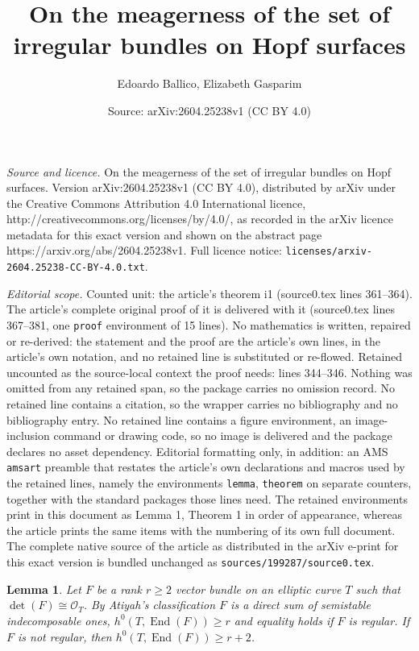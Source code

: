 \documentclass[10pt,a4paper]{amsart}
\title{On the meagerness of the set of irregular bundles on Hopf surfaces}
\author{Edoardo Ballico, Elizabeth Gasparim}
\date{Source: arXiv:2604.25238v1 (CC BY 4.0)}
\newtheorem{lemma}{Lemma}
\newcommand{\End}{\op{End}}
\newcommand{\Oo}{\enm{\cal{O}}}
\newcommand{\cal}[1]{\mathcal{#1}}
\newcommand{\enm}[1]{\ensuremath{#1}}          %
\newcommand{\op}[1]{\operatorname{#1}}
\begin{document}
\maketitle

\noindent\emph{Source and licence.} On the meagerness of the set of irregular bundles on Hopf surfaces. Version arXiv:2604.25238v1 (CC BY 4.0), distributed by arXiv under the Creative Commons Attribution 4.0 International licence, http://creativecommons.org/licenses/by/4.0/, as recorded in the arXiv licence metadata for this exact version and shown on the abstract page https://arxiv.org/abs/2604.25238v1. Full licence notice: \texttt{licenses/arxiv-2604.25238-CC-BY-4.0.txt}.\par\smallskip

\noindent\textit{Editorial scope.} Counted unit: the article's theorem i1 (source0.tex lines 361--364). The article's complete original proof of it is delivered with it (source0.tex lines 367--381, one \texttt{proof} environment of 15 lines). No mathematics is written, repaired or re-derived: the statement and the proof are the article's own lines, in the article's own notation, and no retained line is substituted or re-flowed.  Retained uncounted as the source-local context the proof needs: lines 344--346.  Nothing was omitted from any retained span, so the package carries no omission record.  No retained line contains a citation, so the wrapper carries no bibliography and no bibliography entry.  No retained line contains a figure environment, an image-inclusion command or drawing code, so no image is delivered and the package declares no asset dependency.  Editorial formatting only, in addition: an AMS \texttt{amsart} preamble that restates the article's own declarations and macros used by the retained lines, namely the environments \texttt{lemma}, \texttt{theorem} on separate counters, together with the standard packages those lines need.  The retained environments print in this document as Lemma 1, Theorem 1 in order of appearance, whereas the article prints the same items with the numbering of its own full document.  The complete native source of the article as distributed in the arXiv e-print for this exact version is bundled unchanged as \texttt{sources/199287/source0.tex}.
\begin{lemma}\label{i3}
Let $F$ be a rank $r\ge 2$ vector bundle on an elliptic curve $T$ such that $\det(F)\cong \Oo_T$. By Atiyah's classification $F$ is a direct sum of semistable indecomposable ones, $h^0(T,\End(F)) \ge r$ and equality holds if  $F$ is regular. If $F$ is not regular, then $h^0(T,\End(F)) \ge r+2$.
\end{lemma}
\end{document}
